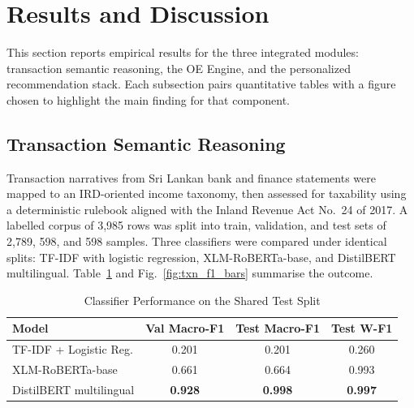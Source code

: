 \documentclass[conference]{IEEEtran}
\begin{document}
\section{Results and Discussion}
This section reports empirical results for the three integrated modules: transaction semantic reasoning, the OE Engine, and the personalized recommendation stack. Each subsection pairs quantitative tables with a figure chosen to highlight the main finding for that component.

\subsection{Transaction Semantic Reasoning}
Transaction narratives from Sri Lankan bank and finance statements were mapped to an IRD-oriented income taxonomy, then assessed for taxability using a deterministic rulebook aligned with the Inland Revenue Act No.~24 of 2017. A labelled corpus of 3,985 rows was split into train, validation, and test sets of 2,789, 598, and 598 samples. Three classifiers were compared under identical splits: TF-IDF with logistic regression, XLM-RoBERTa-base, and DistilBERT multilingual. Table~\ref{tab:classifier_performance} and Fig.~\ref{fig:txn_f1_bars} summarise the outcome.

\begin{table}[htbp]
\caption{Classifier Performance on the Shared Test Split}
\begin{center}
\renewcommand{\arraystretch}{1.2}
\setlength{\tabcolsep}{3pt}
\begin{tabularx}{\columnwidth}{|X|c|c|c|}
\hline
\textbf{Model} & \textbf{Val Macro-F1} & \textbf{Test Macro-F1} & \textbf{Test W-F1} \\
\hline
TF-IDF + Logistic Reg. & 0.201 & 0.201 & 0.260 \\
XLM-RoBERTa-base       & 0.661 & 0.664 & 0.993 \\
DistilBERT multilingual & \textbf{0.928} & \textbf{0.998} & \textbf{0.997} \\
\hline
\end{tabularx}
\label{tab:classifier_performance}
\end{center}
\end{table}
\end{document}
